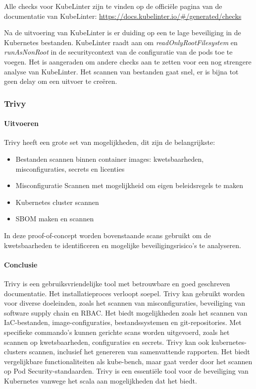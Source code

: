 Alle checks voor KubeLinter zijn te vinden op de officiële pagina van de documentatie van KubeLinter: \url{https://docs.kubelinter.io/#/generated/checks }


Na de uitvoering van KubeLinter is er duiding op een te lage beveiliging in de Kubernetes bestanden. KubeLinter raadt aan om \textit{readOnlyRootFilesystem} en \textit{runAsNonRoot} in de securitycontext van de configuratie van de pods toe te voegen. Het is aangeraden om andere checks aan te zetten voor een nog strengere analyse van KubeLinter. Het scannen van bestanden gaat snel, er is bijna tot geen delay om een uitvoer te creëren. 

\subsubsection{Trivy}

\paragraph{Uitvoeren}
Trivy heeft een grote set van mogelijkheden, dit zijn de belangrijkste:
\begin{itemize}
    \item Bestanden scannen binnen container images: kwetsbaarheden, misconfiguraties, secrets en licenties
    \item Misconfiguratie Scannen met mogelijkheid om eigen beleidsregels te maken
    \item Kubernetes cluster scannen
    \item SBOM maken en scannen
\end{itemize}

In deze proof-of-concept worden bovenstaande scans gebruikt om de kwetsbaarheden te identificeren en mogelijke beveiligingsrisico's te analyseren.


\paragraph{Conclusie}
Trivy is een gebruiksvriendelijke tool met betrouwbare en goed geschreven documentatie. Het installatieproces verloopt soepel. Trivy kan gebruikt worden voor diverse doeleinden, zoals het scannen van misconfiguraties, beveiliging van software supply chain en RBAC. Het biedt mogelijkheden zoals het scannen van IaC-bestanden, image-configuraties, bestandssystemen en git-repositories. Met specifieke commando's kunnen gerichte scans worden uitgevoerd, zoals het scannen op kwetsbaarheden, configuraties en secrets. Trivy kan ook kubernetes-clusters scannen, inclusief het genereren van samenvattende rapporten. Het biedt vergelijkbare functionaliteiten als kube-bench, maar gaat verder door het scannen op Pod Security-standaarden. Trivy is een essentiële tool voor de beveiliging van Kubernetes vanwege het scala aan mogelijkheden dat het biedt.

